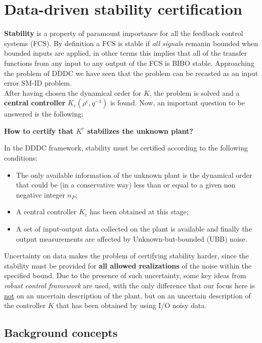 \section{Data-driven stability certification}
\textbf{Stability} is a property of paramount importance for all the feedback control systems (FCS). By definition a FCS is stable if \textit{all signals} remanin bounded when bounded inputs are applied, in other terms this implies that all of the transfer functions from any input to any output of the FCS is BIBO stable. Approaching the problem of DDDC we have seen that the problem can be recasted as an input error SM-ID problem.\\
After having chosen the dynamical order for $K$, the problem is solved and a \textbf{central controller} $K_c(\rho^c,q^{-1})$ is found. Now, an important question to be answered is the following:
\begin{center}
    \textbf{How to certify that $K^c$ stabilizes the unknown plant?}
\end{center}
In the DDDC framework, stability must be certified according to the following conditions:
\begin{itemize}
    \itemsep-0.2em
    \item The only available information of the unknown plant is the dynamical order that could be (in a conservative way) less than or equal to a given non negative integer $n_P$; 
    \item A central controller $K_c$ has been obtained at this stage;
    \item A set of input-output data collected on the plant is available and finally the output measurements are affected by Unknown-but-bounded (UBB) noise.
\end{itemize}

Uncertainty on data makes the problem of certifying stability harder, since the stability must be provided for \textbf{all allowed realizations} of the noise within the specified bound. Due to the presence of such uncertainty, some key ideas from \textit{robust control framework} are used, with the only difference that our focus here is \underline{not} on an uncertain description of the plant, but on an uncertain description of the controller $K$ that has been obtained by using I/O noisy data.

\subsection{Background concepts}

